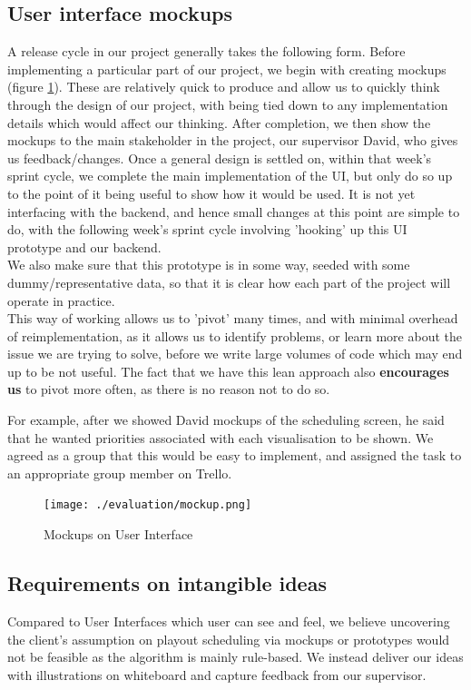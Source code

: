 \documentclass[a4paper]{article}
\begin{document}
\subsection{User interface mockups}
A release cycle in our project generally takes the following form. Before implementing a particular part of our project, we begin with creating mockups (figure \ref{fig:mockup}). These are relatively quick to produce and allow us to quickly think through the design of our project, with being tied down to any implementation details which would affect our thinking. After completion, we then show the mockups to the main stakeholder in the project, our supervisor David, who gives us feedback/changes. Once a general design is settled on, within that week's sprint cycle, we complete the main implementation of the UI, but only do so up to the point of it being useful to show how it would be used. It is not yet interfacing with the backend, and hence small changes at this point are simple to do, with the following week's sprint cycle involving 'hooking' up this UI prototype and our backend.\\

We also make sure that this prototype is in some way, seeded with some dummy/representative data, so that it is clear how each part of the project will operate in practice.\\

This way of working allows us to 'pivot' many times, and with minimal overhead of reimplementation, as it allows us to identify problems, or learn more about the issue we are trying to solve, before we write large volumes of code which may end up to be not useful. The fact that we have this lean approach also \textbf{encourages us} to pivot more often, as there is no reason not to do so.

For example, after we showed David mockups of the scheduling screen, he said that 
he wanted priorities associated with each visualisation to be shown. We agreed as a 
group that this would be easy to implement, and assigned the task to an appropriate
group member on Trello.  %

\begin{figure}[H]
   \begin{center}
      \texttt{[image: ./evaluation/mockup.png]}
   \end{center}
   \caption{Mockups on User Interface}
   \label{fig:mockup}
\end{figure}

\subsection{Requirements on intangible ideas}
Compared to User Interfaces which user can see and feel, we believe 
uncovering the client's assumption on playout scheduling via mockups or 
prototypes would not be feasible as the algorithm is mainly rule-based.
We instead deliver our ideas with illustrations on whiteboard and
capture feedback from our supervisor.
\end{document}
